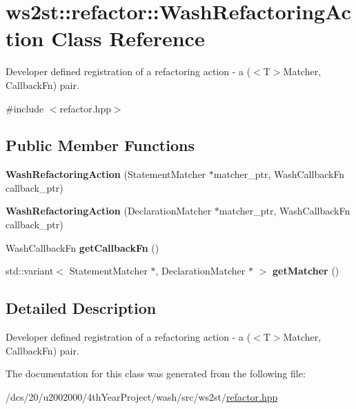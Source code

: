 \hypertarget{classws2st_1_1refactor_1_1WashRefactoringAction}{}\section{ws2st\+:\+:refactor\+:\+:Wash\+Refactoring\+Action Class Reference}
\label{classws2st_1_1refactor_1_1WashRefactoringAction}


Developer defined registration of a refactoring action -\/ a ($<$\+T$>$Matcher, Callback\+Fn) pair.  




{\ttfamily \#include $<$refactor.\+hpp$>$}

\subsection*{Public Member Functions}
\begin{DoxyCompactItemize}
\item 
\mbox{\label{classws2st_1_1refactor_1_1WashRefactoringAction_a37b89a13a8e91735717cc1df37e8eabb}} 
{\bfseries Wash\+Refactoring\+Action} (Statement\+Matcher $\ast$matcher\+\_\+ptr, Wash\+Callback\+Fn callback\+\_\+ptr)
\item 
\mbox{\label{classws2st_1_1refactor_1_1WashRefactoringAction_a5ebcf97bf4b5fec82c4a9c931b61ae2b}} 
{\bfseries Wash\+Refactoring\+Action} (Declaration\+Matcher $\ast$matcher\+\_\+ptr, Wash\+Callback\+Fn callback\+\_\+ptr)
\item 
\mbox{\label{classws2st_1_1refactor_1_1WashRefactoringAction_aaf97a9edbe147cb2d5697d28c5485924}} 
Wash\+Callback\+Fn {\bfseries get\+Callback\+Fn} ()
\item 
\mbox{\label{classws2st_1_1refactor_1_1WashRefactoringAction_a22a440b7927da3ab1561a9292b9ee0d6}} 
std\+::variant$<$ Statement\+Matcher $\ast$, Declaration\+Matcher $\ast$ $>$ {\bfseries get\+Matcher} ()
\end{DoxyCompactItemize}


\subsection{Detailed Description}
Developer defined registration of a refactoring action -\/ a ($<$\+T$>$Matcher, Callback\+Fn) pair. 

The documentation for this class was generated from the following file\+:\begin{DoxyCompactItemize}
\item 
/dcs/20/u2002000/4th\+Year\+Project/wash/src/ws2st/\mbox{\hyperlink{refactor_8hpp}{refactor.\+hpp}}\end{DoxyCompactItemize}
